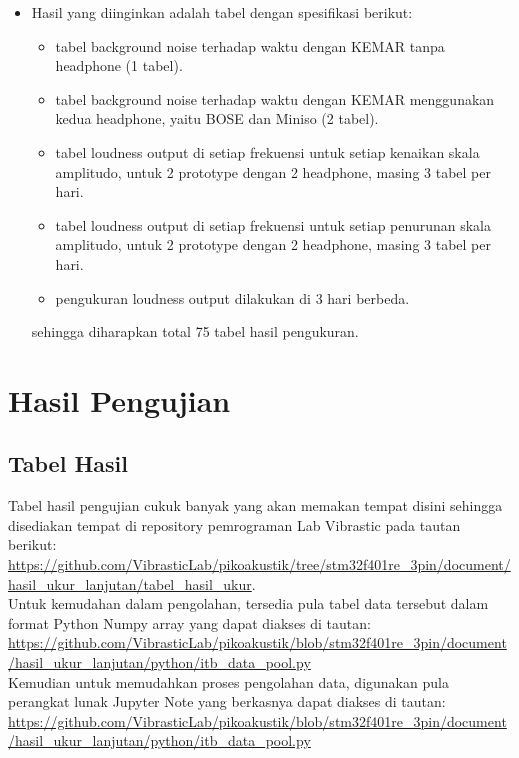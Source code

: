 \documentclass[12pt,]{article}
\begin{document}
\begin{itemize}
		\item Hasil yang diinginkan adalah tabel dengan spesifikasi berikut:
		\begin{itemize}
			\item tabel background noise terhadap waktu dengan KEMAR tanpa headphone (1 tabel).
			\item tabel background noise terhadap waktu dengan KEMAR menggunakan kedua headphone, yaitu BOSE dan Miniso (2 tabel).
			\item tabel loudness output di setiap frekuensi untuk setiap kenaikan skala amplitudo, untuk 2 prototype dengan 2 headphone, masing 3 tabel per hari.
			\item tabel loudness output di setiap frekuensi untuk setiap penurunan skala amplitudo, untuk 2 prototype dengan 2 headphone, masing 3 tabel per hari.
			\item pengukuran loudness output dilakukan di 3 hari berbeda.
		\end{itemize}

		sehingga diharapkan total 75 tabel hasil pengukuran.
	\end{itemize}

	\newpage
	\section{Hasil Pengujian}

	\subsection{Tabel Hasil}

	Tabel hasil pengujian cukuk banyak yang akan memakan tempat disini sehingga disediakan tempat di repository pemrograman Lab Vibrastic pada tautan berikut:\\
	\url{https://github.com/VibrasticLab/pikoakustik/tree/stm32f401re_3pin/document/hasil_ukur_lanjutan/tabel_hasil_ukur}.\\

	Untuk kemudahan dalam pengolahan, tersedia pula tabel data tersebut dalam format Python Numpy array yang dapat diakses di tautan:\\
	\url{https://github.com/VibrasticLab/pikoakustik/blob/stm32f401re_3pin/document/hasil_ukur_lanjutan/python/itb_data_pool.py}\\

	Kemudian untuk memudahkan proses pengolahan data, digunakan pula perangkat lunak Jupyter Note yang berkasnya dapat diakses di tautan:\\
	\url{https://github.com/VibrasticLab/pikoakustik/blob/stm32f401re_3pin/document/hasil_ukur_lanjutan/python/itb_data_pool.py}\\
\end{document}
